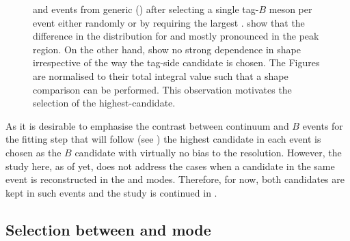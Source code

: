 \begin{figure}[htbp!]
{    and \mbox{\epem\ra\qqbar} events from generic \MC () after selecting a single tag-$B$ meson per event either randomly or by requiring the largest \feiProb.
     show that the difference in the \Mbc distribution for \BptoXsgamma and \BztoXsgamma mostly pronounced in the peak region.
    On the other hand,  show no strong dependence in shape irrespective of the way the tag-side candidate is chosen.
    The Figures are normalised to their total integral value such that a shape comparison can be performed.
    This observation motivates the selection of the highest-\feiProb candidate.
    }    
\end{figure}

As it is desirable to emphasise the contrast between continuum and $B$ events for the fitting step that will follow (see )
the highest \feiProb candidate in each event is chosen as the $B$ candidate with virtually no bias to the resolution.
However, the study here, as of yet, does not address the cases when a candidate in the same event is reconstructed in the \feiBp and \feiBz modes.
Therefore, for now, both candidates are kept in such events and the study is continued in .

\subsection{Selection between \texorpdfstring{\feiBp}{feiB+} and \texorpdfstring{\feiBz}{feiB0} mode}\label{sec:select_best_candidate}

